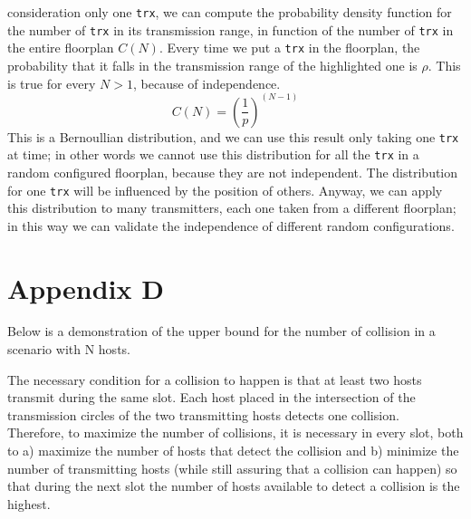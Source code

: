 consideration only one \texttt{trx}, we can compute the probability density
function for the number of \texttt{trx} in its transmission range, in function
of the number of \texttt{trx} in the entire floorplan $C(N)$. Every time we put
a \texttt{trx} in the floorplan, the probability that it falls in the
transmission range of the highlighted one is $\rho$. This is true for every
$N > 1$, because of independence.
\begin{equation*}
    C(N)= \left(\frac{1}{p}\right)^{\left( N-1 \right)}
\end{equation*}
This is a Bernoullian distribution, and we can use this result only taking one
\texttt{trx} at time; in other words we cannot use this distribution for all the
\texttt{trx} in a random configured floorplan, because they are not independent. 
The distribution for one \texttt{trx} will be influenced by the position of
others. Anyway, we can apply this distribution to many transmitters, each one
taken from a different floorplan; in this way we can validate the independence
of different random configurations.

\section{Appendix D}
\label{app:d}
Below is a demonstration of the upper bound for the number of collision in a scenario with N hosts.

\hfill \break
The necessary condition for a collision to happen is that at least two hosts transmit during the same slot. Each host placed in the intersection of the transmission circles of the two transmitting hosts detects one collision. \\
Therefore, to maximize the number of collisions, it is necessary in every slot, both to a) maximize the number of hosts that detect the collision and b) minimize the number of transmitting hosts (while still assuring that a collision can happen) so that during the next slot the number of hosts available to detect a collision is the highest.

